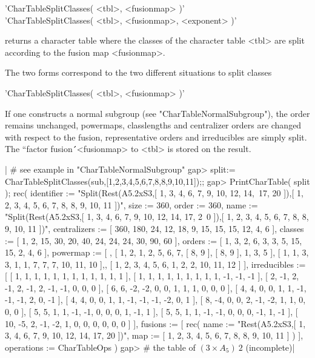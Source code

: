 %

'CharTableSplitClasses( <tbl>, <fusionmap> )'\\
'CharTableSplitClasses( <tbl>, <fusionmap>, <exponent> )'

returns a character table where the classes of the character table <tbl>
are split according to the fusion map <fusionmap>.

The two forms correspond to the two different situations to split
classes\:

'CharTableSplitClasses( <tbl>, <fusionmap> )'

If one constructs a normal subgroup (see "CharTableNormalSubgroup"),
the order remains unchanged, powermaps, classlengths and centralizer
orders are changed with respect to the fusion, representative orders and
irreducibles are simply split.
The ``factor fusion\'\'\ <fusionmap> to <tbl> is stored on the result.

|    # see example in "CharTableNormalSubgroup"
    gap> split:= CharTableSplitClasses(sub,[1,2,3,4,5,6,7,8,8,9,10,11]);;
    gap> PrintCharTable( split );
    rec( identifier := "Split(Rest(A5.2xS3,[ 1, 3, 4, 6, 7, 9, 10, 12, 14,\
     17, 20 ]),[ 1, 2, 3, 4, 5, 6, 7, 8, 8, 9, 10, 11 ])", size :=
    360, order :=
    360, name := "Split(Rest(A5.2xS3,[ 1, 3, 4, 6, 7, 9, 10, 12, 14, 17, 2\
    0 ]),[ 1, 2, 3, 4, 5, 6, 7, 8, 8, 9, 10, 11 ])", centralizers :=
    [ 360, 180, 24, 12, 18, 9, 15, 15, 15, 12, 4, 6 ], classes :=
    [ 1, 2, 15, 30, 20, 40, 24, 24, 24, 30, 90, 60 ], orders :=
    [ 1, 3, 2, 6, 3, 3, 5, 15, 15, 2, 4, 6 ], powermap :=
    [ , [ 1, 2, 1, 2, 5, 6, 7, [ 8, 9 ], [ 8, 9 ], 1, 3, 5 ],
      [ 1, 1, 3, 3, 1, 1, 7, 7, 7, 10, 11, 10 ],,
      [ 1, 2, 3, 4, 5, 6, 1, 2, 2, 10, 11, 12 ] ], irreducibles :=
    [ [ 1, 1, 1, 1, 1, 1, 1, 1, 1, 1, 1, 1 ],
      [ 1, 1, 1, 1, 1, 1, 1, 1, 1, -1, -1, -1 ],
      [ 2, -1, 2, -1, 2, -1, 2, -1, -1, 0, 0, 0 ],
      [ 6, 6, -2, -2, 0, 0, 1, 1, 1, 0, 0, 0 ],
      [ 4, 4, 0, 0, 1, 1, -1, -1, -1, 2, 0, -1 ],
      [ 4, 4, 0, 0, 1, 1, -1, -1, -1, -2, 0, 1 ],
      [ 8, -4, 0, 0, 2, -1, -2, 1, 1, 0, 0, 0 ],
      [ 5, 5, 1, 1, -1, -1, 0, 0, 0, 1, -1, 1 ],
      [ 5, 5, 1, 1, -1, -1, 0, 0, 0, -1, 1, -1 ],
      [ 10, -5, 2, -1, -2, 1, 0, 0, 0, 0, 0, 0 ] ], fusions := [ rec(
          name := "Rest(A5.2xS3,[ 1, 3, 4, 6, 7, 9, 10, 12, 14, 17, 20 ])",
          map := [ 1, 2, 3, 4, 5, 6, 7, 8, 8, 9, 10, 11 ] )
     ], operations := CharTableOps )
    gap> # the table of $(3\times A_5)\!\:\! 2$ (incomplete)|

